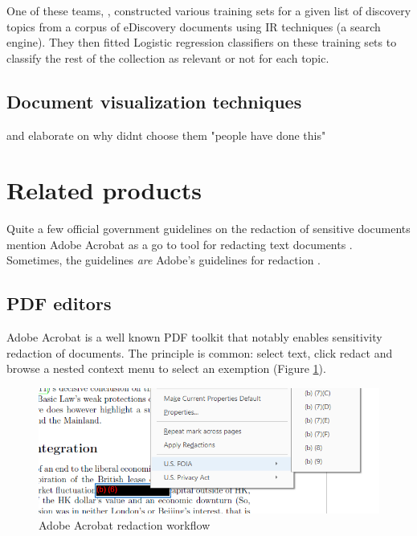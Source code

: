 \documentclass{l4proj}
\begin{document}
One of these teams, \textcite{cormackEvaluationMachinelearningProtocols2014}, constructed various training sets for a given list of discovery topics from a corpus of eDiscovery documents using IR techniques (a search engine). They then fitted Logistic regression classifiers on these training sets to classify the rest of the collection as relevant or not for each topic.


\subsection{Document visualization techniques}

and elaborate on why didnt choose them
"people have done this"

\section{Related products}

Quite a few official government guidelines on the redaction of sensitive documents mention Adobe Acrobat as a go to tool for redacting text documents \autocite{thenationalarchivesRedactionToolkitPaper2016}. 
Sometimes, the guidelines \textit{are} Adobe's guidelines for redaction \autocite{scottishgovernmentRedactingInformation2019}.

\subsection{PDF editors}

Adobe Acrobat is a well known PDF toolkit that notably enables sensitivity redaction of documents. 
The principle is common: select text, click redact and browse a nested context menu to select an exemption (Figure \ref{fig:adobe-redaction}).

\begin{figure}[H]
    \centering
    \includegraphics[width=\linewidth]{images/adobe_redaction.png}
    \caption{Adobe Acrobat redaction workflow}
    \label{fig:adobe-redaction}
\end{figure}
\end{document}
